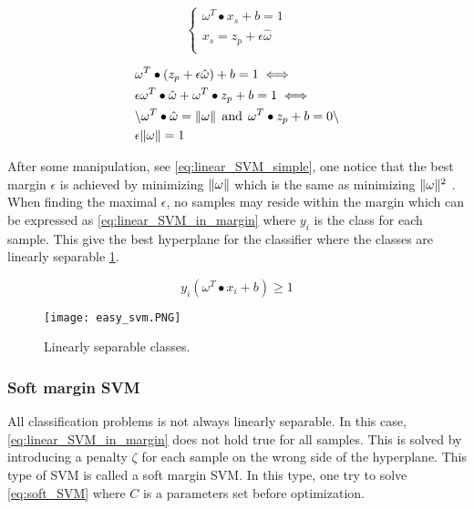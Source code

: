 \begin{equation} \label{eq:linear_SVM}
\begin{cases}
\omega^T \bullet x_s + b =1\\
x_s = z_p + \epsilon \hat{\omega} \\
\end{cases}
\end{equation}

\begin{equation} \label{eq:linear_SVM_simple}
\begin{split}
& \omega^T \bullet (z_p + \epsilon \hat{\omega}) + b = 1  \iff \\
& \epsilon \omega^T \bullet \hat{\omega} + \omega^T \bullet z_p + b = 1 \iff \\
& \backslash \omega^T \bullet \hat{\omega} = \lVert\omega\rVert \:\:  \text{and} \:\: \omega^T \bullet z_p + b = 0  \backslash \\
& \epsilon \lVert\omega\rVert = 1
\end{split}
\end{equation} 

After some manipulation, see \cref{eq:linear_SVM_simple}, one notice that the best margin $\epsilon$ is achieved by minimizing $\lVert\omega\rVert$ which is the same as minimizing $\lVert\omega\rVert^2$ . When finding the maximal $\epsilon$, no samples may reside within the margin which can be expressed as \cref{eq:linear_SVM_in_margin} where $y_i$ is the class for each sample. This give the best hyperplane for the classifier where the classes are linearly separable \cref{fig:easy_class}.

\begin{equation} \label{eq:linear_SVM_in_margin}
y_i(\omega^T \bullet x_i + b) \geq 1
\end{equation} 

\FloatBarrier
\begin{figure}[!h]
	\centering
	\texttt{[image: easy\_svm.PNG]}
	\caption{Linearly separable classes.
		\label{fig:easy_class}}
\end{figure} 
\FloatBarrier


\subsubsection{Soft margin SVM}

All classification problems is not always linearly separable. In this case, \cref{eq:linear_SVM_in_margin} does not hold true for all samples. This is solved by introducing a penalty $\zeta$ \cite{cortes1995support} for each sample on the wrong side of the hyperplane. This type of SVM is called a soft margin SVM. In this type, one try to solve \cref{eq:soft_SVM} where $C$ is a parameters set before optimization. 

